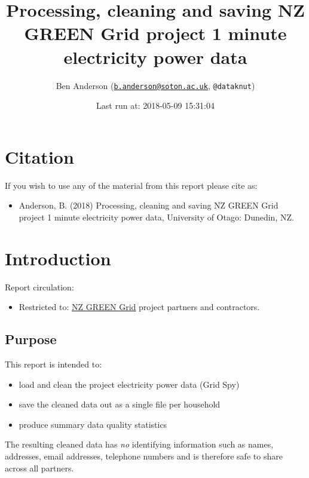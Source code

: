 \documentclass[]{article}
\title{Processing, cleaning and saving NZ GREEN Grid project 1 minute
electricity power data}
\author{Ben Anderson
(\href{mailto:b.anderson@soton.ac.uk}{\nolinkurl{b.anderson@soton.ac.uk}},
\texttt{@dataknut})}
\date{Last run at: 2018-05-09 15:31:04}
\providecommand{\tightlist}{%
  \setlength{\itemsep}{0pt}\setlength{\parskip}{0pt}}
\begin{document}
\maketitle

{
\setcounter{tocdepth}{2}
\tableofcontents
}
\newpage

\section{Citation}\label{citation}

If you wish to use any of the material from this report please cite as:

\begin{itemize}
\tightlist
\item
  Anderson, B. (2018) Processing, cleaning and saving NZ GREEN Grid
  project 1 minute electricity power data, University of Otago: Dunedin,
  NZ.
\end{itemize}

\newpage

\section{Introduction}\label{introduction}

Report circulation:

\begin{itemize}
\tightlist
\item
  Restricted to:
  \href{https://www.otago.ac.nz/centre-sustainability/research/energy/otago050285.html}{NZ
  GREEN Grid} project partners and contractors.
\end{itemize}

\subsection{Purpose}\label{purpose}

This report is intended to:

\begin{itemize}
\tightlist
\item
  load and clean the project electricity power data (Grid Spy)
\item
  save the cleaned data out as a single file per household
\item
  produce summary data quality statistics
\end{itemize}

The resulting cleaned data has \emph{no} identifying information such as
names, addresses, email addresses, telephone numbers and is therefore
safe to share across all partners.
\end{document}
